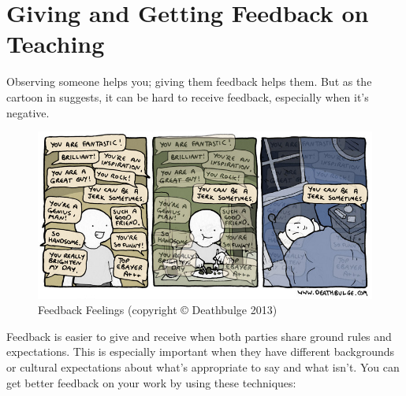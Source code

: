 \section{Giving and Getting Feedback on Teaching}\label{s:performance-feedback}

Observing someone helps you; giving them feedback helps them.  But as
the cartoon in  suggests, it
can be hard to receive feedback, especially when it's negative.

\begin{figure}
\centering
\includegraphics{../docs/fig/deathbulge-jerk.jpg}
\caption{Feedback Feelings (copyright {\copyright} Deathbulge 2013)}
\label{f:performance-feedback-feelings}
\end{figure}

Feedback is easier to give and receive when both parties share ground
rules and expectations.  This is especially important when they have
different backgrounds or cultural expectations about what's
appropriate to say and what isn't.  You can get better feedback on
your work by using these techniques:

